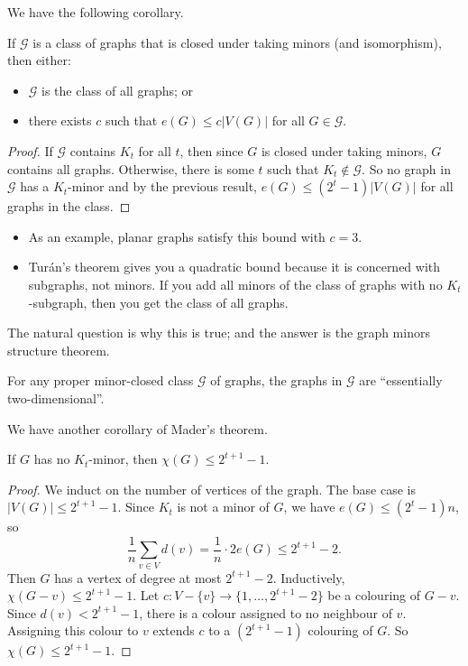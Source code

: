 \documentclass[main.tex]{subfiles}
\begin{document}
We have the following corollary.
\begin{corollary}
  If $\mathcal G$ is a class of graphs that is closed under taking minors
  (and isomorphism), then either:
  \begin{itemize}
    \item $\mathcal G$ is the class of all graphs; or
    \item there exists $c$ such that $e(G)\leq c|V(G)|$ for all $G\in\mathcal G$.
  \end{itemize}
\end{corollary}
\begin{proof}
  If $\mathcal G$ contains $K_t$ for all $t$, then since $G$ is closed under
  taking minors, $G$ contains all graphs.
  Otherwise, there is some $t$ such that $K_t\notin\mathcal G$.
  So no graph in $\mathcal G$ has a $K_t$-minor and by the previous result,
  $e(G)\leq (2^t-1)|V(G)|$ for all graphs in the class.
\end{proof}
\begin{remark*}
  \listhack
  \begin{itemize}
    \item As an example, planar graphs satisfy this bound with $c = 3$.

    \item Tur\'an's theorem gives you a quadratic bound because it is concerned
      with subgraphs, not minors.
      If you add all minors of the class of graphs with no $K_t$-subgraph,
      then you get the class of all graphs.
  \end{itemize}
\end{remark*}
The natural question is why this is true; and the answer is the graph minors
structure theorem.
\begin{theorem}
  For any proper minor-closed class $\mathcal G$ of graphs, the graphs in
  $\mathcal G$ are ``essentially two-dimensional''.
\end{theorem}
We have another corollary of Mader's theorem.
\begin{corollary}
  If $G$ has no $K_t$-minor, then $\chi(G)\leq 2^{t+1}-1$.
\end{corollary}
\begin{proof}
  We induct on the number of vertices of the graph.
  The base case is $|V(G)|\leq 2^{t+1}-1$.
  Since $K_t$ is not a minor of $G$, we have $e(G)\leq(2^t-1)n$, so
  \[
    \frac{1}{n}\sum_{v\in V} d(v) = \frac{1}{n}\cdot 2e(G)\leq 2^{t+1}-2.
  \]
  Then $G$ has a vertex of degree at most $2^{t+1}-2$.
  Inductively, $\chi(G-v)\leq 2^{t+1}-1$.
  Let $c:V - \{v\}\to\{1,\ldots,2^{t+1}-2\}$ be a colouring of $G-v$.
  Since $d(v) < 2^{t+1}-1$, there is a colour assigned to no neighbour of $v$.
  Assigning this colour to $v$ extends $c$ to a $(2^{t+1}-1)$ colouring of $G$.
  So $\chi(G)\leq 2^{t+1}-1$.
\end{proof}
\end{document}
